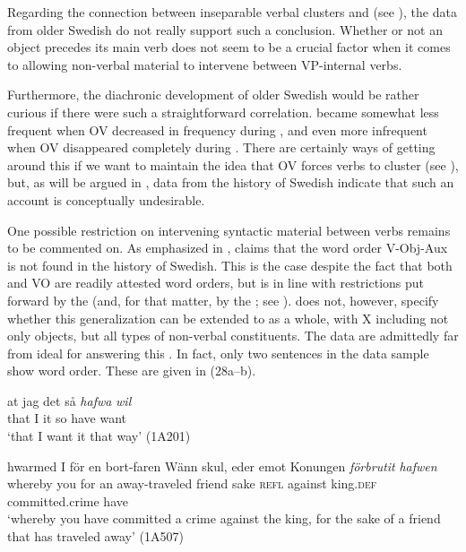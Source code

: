 \documentclass[output=paper, colorlinks, citecolor=brown]{langscibook}
\begin{document}
Regarding the connection between inseparable verbal clusters and  (see \citealt[17–19, 33–35]{Haider2010}), the data from older Swedish do not really support such a conclusion. Whether or not an object precedes its main verb does not seem to be a crucial factor when it comes to allowing non-verbal material to intervene between VP-internal verbs.



Furthermore, the diachronic development of older Swedish would be rather curious if there were such a straightforward correlation.  became somewhat less frequent when OV decreased in frequency during , and even more infrequent when OV disappeared completely during . There are certainly ways of getting around this if we want to maintain the idea that OV forces verbs to cluster (see \cites[290–292]{Haider2010}[132–135]{Haider2013}), but, as will be argued in , data from the history of Swedish indicate that such an account is conceptually undesirable.



One possible restriction on intervening syntactic material between verbs remains to be commented on. As emphasized in , \citet[155, 159]{Petzell2011}  claims that the word order V-Obj-Aux is not found in the history of Swedish. This is the case despite the fact that both  and VO are readily attested word orders, but is in line with restrictions put forward by the  (and, for that matter, by the ; see ). \citet{Petzell2011} does not, however, specify whether this generalization can be extended to  as a whole, with X including not only objects, but all types of non-verbal constituents. The  data are admittedly far from ideal for answering this . In fact, only two sentences in the data sample show  word order. These are given in (28a–b).


\ea\label{ex:sangfelt:28}
\ea\label{ex:sangfelt:28a}
\gll at jag det så \textit{hafwa} \textit{wil} \\ %
 that I it so have want\\
\glt ‘that I want it that way’ (1A201)

\ex\label{ex:sangfelt:28b}
\gll hwarmed I {för} {en} {bort-faren} {Wänn} {skul,} {eder} {emot} {Konungen} \textit{förbrutit} \textit{hafwen}\\
 whereby you for an away-traveled friend sake \textsc{refl} against king.\textsc{def} committed.crime have\\
\glt ‘whereby you have committed a crime against the king, for the sake of a friend that has traveled away’ (1A507)
\z 
\z 
\end{document}
